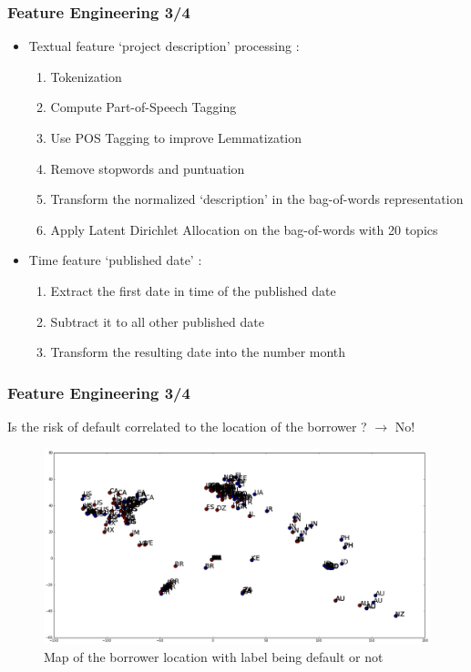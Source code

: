 \documentclass[10pt,handout,english]{beamer}
\begin{document}
		\begin{frame}
		\frametitle{Feature Engineering 3/4}
			\begin{itemize}
				\item Textual feature `project description' processing :
					\begin{enumerate}
						\item Tokenization
						\item Compute Part-of-Speech Tagging
						\item Use POS Tagging to improve Lemmatization
						\item Remove stopwords and puntuation
						\item Transform the normalized `description' in the bag-of-words representation
						\item Apply Latent Dirichlet Allocation on the bag-of-words with 20 topics
					\end{enumerate}
				\item Time feature `published date' :
					\begin{enumerate}
						\item Extract the first date in time of the published date
						\item Subtract it to all other published date
						\item Transform the resulting date into the number month
					\end{enumerate}
			\end{itemize}
		\end{frame}

		\begin{frame}
		\frametitle{Feature Engineering 3/4}
			Is the risk of default correlated to the location of the borrower ? $\rightarrow$ No!
			\begin{figure}[h!]
            	\centering
                \includegraphics[width=\textwidth]{location.png}
                \caption{Map of the borrower location with label being default or not}
			\end{figure}
		\end{frame}
\end{document}
